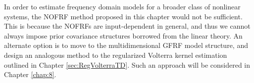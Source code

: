 In order to estimate frequency domain models for a broader class of nonlinear systems, the NOFRF method proposed in this chapter would not be sufficient. This is because the NOFRFs are input-dependent in general, and thus we cannot always impose prior covariance structures borrowed from the linear theory. An alternate option is to move to the multidimensional GFRF model structure, and design an analogous method to the regularized Volterra kernel estimation outlined in Chapter \ref{sec:RegVolterraTD}. Such an approach will be considered in Chapter \ref{chap:8}.